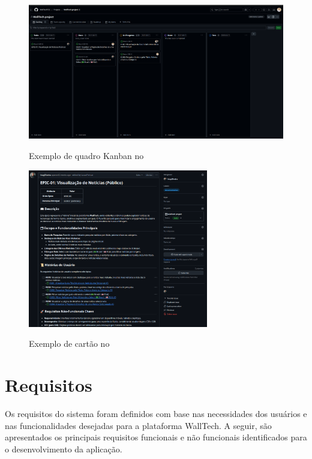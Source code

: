 \begin{figure}[H]
  \centering
  \caption{Exemplo de quadro Kanban no }
  \includegraphics[width=1.0\textwidth]{media/wall_tech_kanban.png}
  \label{fig:kanban-walltech}
\end{figure}

\begin{figure}[H]
  \centering
  \caption{Exemplo de cartão  no }
  \includegraphics[width=0.7\textwidth]{media/wall_tech_epic.png}
  \label{fig:kanban-userstories}
\end{figure}

\section{Requisitos}
\label{section:requisitos}
Os requisitos do sistema foram definidos com base nas necessidades dos usuários e nas funcionalidades desejadas para a plataforma WallTech. A seguir, são apresentados os principais requisitos funcionais e não funcionais identificados para o desenvolvimento da aplicação.

